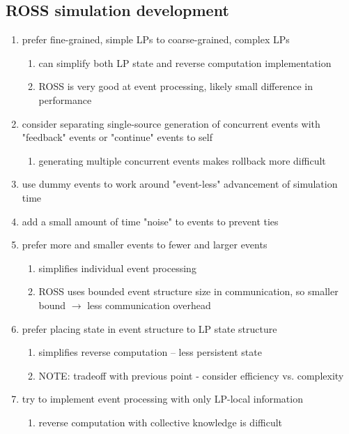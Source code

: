 \documentclass[conference,10pt,compsocconf,onecolumn]{IEEEtran}
\begin{document}
\subsection{ROSS simulation development}

\begin{enumerate}

    \item prefer fine-grained, simple LPs to coarse-grained, complex LPs
    \begin{enumerate}
        \item can simplify both LP state and reverse computation implementation
        \item ROSS is very good at event processing, likely small difference in
            performance
    \end{enumerate}

    \item consider separating single-source generation of concurrent events with
        "feedback" events or "continue" events to self
    \begin{enumerate}
        \item generating multiple concurrent events makes rollback more difficult
    \end{enumerate}

    \item use dummy events to work around "event-less" advancement of simulation time 

    \item add a small amount of time "noise" to events to prevent ties

    \item prefer more and smaller events to fewer and larger events
    \begin{enumerate}
        \item simplifies individual event processing
        \item ROSS uses bounded event structure size in communication, so
            smaller bound $\rightarrow$  less communication overhead
    \end{enumerate}

    \item prefer placing state in event structure to LP state structure
    \begin{enumerate}
        \item simplifies reverse computation -- less persistent state
        \item NOTE: tradeoff with previous point - consider efficiency vs.
            complexity
    \end{enumerate}

    \item try to implement event processing with only LP-local information
    \begin{enumerate}
        \item reverse computation with collective knowledge is difficult
    \end{enumerate}

\end{enumerate}
\end{document}
